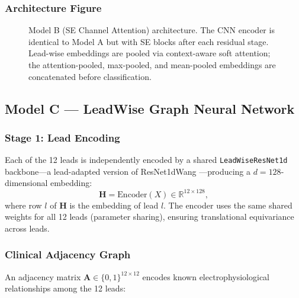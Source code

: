 \subsubsection{Architecture Figure}

\begin{figure}[htbp]
  \centering
  \caption{Model B (SE Channel Attention) architecture.
    The CNN encoder is identical to Model A but with SE blocks after
    each residual stage. Lead-wise embeddings are pooled via
    context-aware soft attention; the attention-pooled, max-pooled,
    and mean-pooled embeddings are concatenated before classification.}
  \label{fig:model_b}
\end{figure}

\subsection{Model C --- LeadWise Graph Neural Network}
\label{subsec:model_c}

\subsubsection{Stage 1: Lead Encoding}

Each of the 12 leads is independently encoded by a shared
\texttt{LeadWiseResNet1d} backbone---a lead-adapted version of
ResNet1dWang \cite{ref34}---producing a $d = 128$-dimensional embedding:
\begin{equation}
  \mathbf{H} = \mathrm{Encoder}(X) \in \mathbb{R}^{12 \times 128},
  \label{eq:lead_embed}
\end{equation}
where row $l$ of $\mathbf{H}$ is the embedding of lead $l$.
The encoder uses the same shared weights for all 12 leads
(parameter sharing), ensuring translational equivariance across leads.

\subsubsection{Clinical Adjacency Graph}

An adjacency matrix $\mathbf{A} \in \{0,1\}^{12 \times 12}$ encodes
known electrophysiological relationships among the 12 leads:

